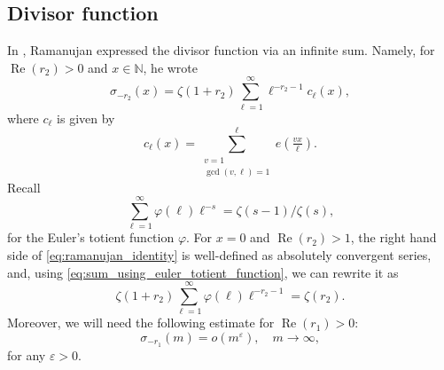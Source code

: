 \documentclass[]{article}
\renewcommand{\Re}{\operatorname{Re}}
\newcommand{\sumk}{\sum_{\substack{\kestermann = 1 \\ \gcd(\kestermann,\ell) = 1}}^\ell}
\begin{document}
\subsection{Divisor function}
\newcommand{\kestermann}{v}
In \cite{ramanujan1918certain}, Ramanujan expressed the divisor function  via an infinite sum. Namely, for $\Re(r_2) >  0$ and $x \in \mathbb{N}$, he wrote 
\begin{equation}\label{eq:ramanujan_identity}
		\sigma_{-r_2}(  x  )   = 
        \zeta(1+r_2)   \sum_{\ell = 1}^\infty \ell^{-r_2 - 1} c_\ell (x),
	\end{equation}
where $c_\ell $ is given by 
	\begin{equation}\label{def:ce}
		c_\ell (x) = \sumk  e( \tfrac{\kestermann x}{\ell}).
	\end{equation}    
Recall 
\begin{equation}\label{eq:sum_using_euler_totient_function}
\sum_{\ell=1}^\infty \varphi(\ell) \ell^{-s} =\zeta(s-1)/\zeta(s) ,   
\end{equation}
for the Euler's totient  function $\varphi$. For $x=0$ and $\Re(r_2)>1$, the right hand side of \eqref{eq:ramanujan_identity} is well-defined as absolutely convergent series, and, using \eqref{eq:sum_using_euler_totient_function}, 
we can rewrite it as 
\begin{equation}\label{eq:sigma0}
    \zeta(1+r_2 ) \sum_{\ell=1}^\infty \varphi(\ell) \ell^{-r_2-1} %
    = \zeta(r_2).
\end{equation}
Moreover, we will need the following estimate for $\Re(r_1) > 0$: 
\begin{equation}\label{eq:divisor_estimate}
\sigma_{-r_1}(m)=o(m^{\varepsilon})    , \quad m \to \infty ,
\end{equation}
for any $\varepsilon>0$.
\end{document}

